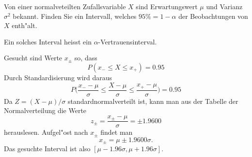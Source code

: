 Von einer normalveteilten Zufallsvariable $X$ sind Erwartungswert $\mu$
und Varianz $\sigma^2$ bekannt. Finden Sie ein Intervall, welches
$95\%=1-\alpha$ der Beobachtungen von $X$ enth"alt.

Ein solches Interval heisst ein $\alpha$-Vertrauensinterval.

\begin{loesung}
Gesucht sind Werte $x_\pm$ so, dass 
\[
P(x_-\le X\le x_+)=0.95
\]
Durch Standardisierung wird daraus
\[
P\biggl(\frac{x_--\mu}{\sigma}\le \frac{X-\mu}{\sigma} \le \frac{x_+-\mu}{\sigma}\biggr)
=0.95
\]
Da $Z=(X-\mu)/\sigma$ standardnormalverteilt ist, kann man aus der
Tabelle der Normalverteilung die Werte
\[
z_\pm=\frac{x_\pm -\mu}{\sigma}=\pm1.9600
\]
herauslesen. Aufgel"ost nach $x_\pm$ findet man
\[
x_\pm = \mu\pm1.9600\sigma.
\]
Das gesuchte Interval ist also $[\mu-1.96\sigma,\mu+1.96\sigma]$.
\end{loesung}

